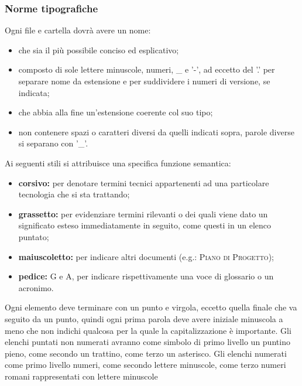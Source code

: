     \subsubsection{Norme tipografiche}
        \label{convezionenomifile}
        Ogni file e cartella dovrà avere un nome:
        \begin{itemize}
            \item che sia il più possibile conciso ed esplicativo;
            \item composto di sole lettere minuscole, numeri, \_ e '-', ad eccetto del '.' per separare nome da estensione e per suddividere i numeri di versione, se indicata;
            \item che abbia alla fine un'estensione coerente col suo tipo;
            \item non contenere spazi o caratteri diversi da quelli indicati sopra, parole diverse si separano con '\_'.
        \end{itemize}
        Ai seguenti stili si attribuisce una specifica funzione semantica:
        \begin{itemize}
            \item \textbf{corsivo: }per denotare termini tecnici appartenenti ad una particolare tecnologia che si sta trattando;
            \item \textbf{grassetto: }per evidenziare termini rilevanti o dei quali viene dato un significato esteso immediatamente in seguito, come questi in un elenco puntato;
            \item \textbf{maiuscoletto: }per indicare altri documenti (e.g.: \textsc{Piano di Progetto});
            \item \textbf{pedice: } G e A, per indicare rispettivamente una voce di glossario o un acronimo.
        \end{itemize}
        Ogni elemento deve terminare con un punto e virgola, eccetto quella finale che va seguito da un punto, quindi ogni prima parola deve avere iniziale minuscola a meno che non indichi qualcosa per la quale la capitalizzazione è importante. Gli elenchi puntati non numerati avranno come simbolo di primo livello un puntino pieno, come secondo un trattino, come terzo un asterisco. Gli elenchi numerati come primo livello numeri, come secondo lettere minuscole, come terzo numeri romani rappresentati con lettere minuscole
